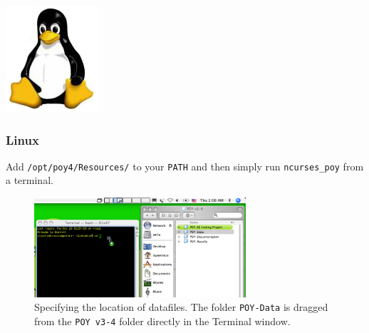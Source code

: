 \begin{flushleft}
	\begin{minipage}[c]{0.075\textwidth}
   		\includegraphics[width=\textwidth]{figures/figLogoLinux.jpg}
	\end{minipage}%
	\quad
	\begin{minipage}[t]{0.89\textwidth}
	   	\subsubsection{Linux}
	\end{minipage}
    Add \texttt{/opt/poy4/Resources/} to your \texttt{PATH} and then simply run
    \texttt{ncurses\_poy} from a terminal.
\end{flushleft}


\begin{figure}[htbp]
   \centering
   \includegraphics[width=0.7\textwidth]{figures/figprelim1.jpg}
   \caption{Specifying the location of datafiles. The folder \texttt{POY-Data} is dragged from the \texttt{POY v3-4} folder directly in the Terminal window.}
   \label{fig:figprelim1}
\end{figure}

